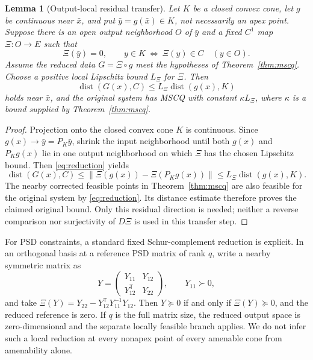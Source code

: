 \documentclass[11pt]{article}
\numberwithin{equation}{section}
\newtheorem{lemma}[theorem]{Lemma}
\theoremstyle{definition}
\theoremstyle{remark}
\DeclareMathOperator{\dist}{dist}
\newcommand{\xb}{\bar x}
\newcommand{\norm}[1]{\lVert #1\rVert}
\newcommand{\dset}[2]{\dist(#1,#2)}
\begin{document}
\begin{lemma}[Output-local residual transfer]
\label{lem:transfer}
Let $K$ be a closed convex cone, let $g$ be continuous near $\xb$, and
put $\bar y=g(\xb)\in K$, not necessarily an apex point.
Suppose there is an open output neighborhood $O$ of
$\bar y$ and a fixed $C^1$ map $\Xi:O\to E$ such that
\begin{equation}
 \Xi(\bar y)=0,\qquad
 y\in K\ \Longleftrightarrow\ \Xi(y)\in C
 \quad(y\in O).
 \label{eq:reduction}
\end{equation}
Assume the reduced data $G=\Xi\circ g$ meet the hypotheses of
Theorem~\ref{thm:mscq}. Choose a positive local Lipschitz bound
$L_\Xi$ for $\Xi$. Then
\begin{equation}
 \dset{G(x)}{C}\leq L_\Xi\dset{g(x)}{K}
 \label{eq:residual-transfer}
\end{equation}
holds near $\xb$, and the original system has MSCQ with constant
$\kappa L_\Xi$, where $\kappa$ is a bound supplied by
Theorem~\ref{thm:mscq}.
\end{lemma}
\begin{proof}
Projection onto the closed convex cone $K$ is continuous. Since
$g(x)\to\bar y=P_K\bar y$, shrink the input neighborhood until both
$g(x)$ and $P_Kg(x)$ lie in one output neighborhood on which $\Xi$ has
the chosen Lipschitz bound. Then \eqref{eq:reduction} yields
\[
 \dset{G(x)}{C}
 \leq\norm{\Xi(g(x))-\Xi(P_Kg(x))}
 \leq L_\Xi\dset{g(x)}{K}.
\]
The nearby corrected feasible points in Theorem~\ref{thm:mscq} are
also feasible for the original system by \eqref{eq:reduction}.
Its distance estimate therefore proves the claimed original bound.
Only this residual direction is needed; neither a reverse comparison
nor surjectivity of $D\Xi$ is used in this transfer step.
\end{proof}

For PSD constraints, a standard fixed Schur-complement reduction is
explicit. In an orthogonal basis at a reference PSD matrix of rank $q$,
write a nearby symmetric matrix as
\[
 Y=\begin{pmatrix}Y_{11}&Y_{12}\\Y_{12}^{\mathsf T}&Y_{22}\end{pmatrix},
 \qquad Y_{11}\succ0,
\]
and take
$\Xi(Y)=Y_{22}-Y_{12}^{\mathsf T}Y_{11}^{-1}Y_{12}$.
Then $Y\succeq0$ if and only if $\Xi(Y)\succeq0$, and the reduced
reference is zero. If $q$ is the full matrix size, the reduced output
space is zero-dimensional and the separate locally feasible branch
applies. We do not infer such a local reduction at every nonapex point
of every amenable cone from amenability alone.
\end{document}
